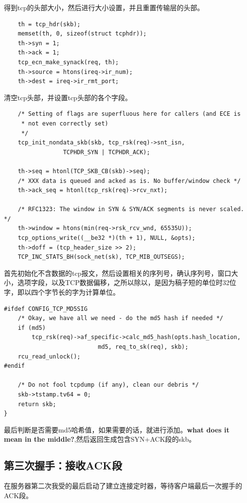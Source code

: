 				得到tcp的头部大小，然后进行大小设置，并且重置传输层的头部。

\begin{verbatim}
	th = tcp_hdr(skb);
	memset(th, 0, sizeof(struct tcphdr));
	th->syn = 1;
	th->ack = 1;
	tcp_ecn_make_synack(req, th);
	th->source = htons(ireq->ir_num);
	th->dest = ireq->ir_rmt_port;
\end{verbatim}

				清空tcp头部，并设置tcp头部的各个字段。

\begin{verbatim}
	/* Setting of flags are superfluous here for callers (and ECE is
	 * not even correctly set)
	 */
	tcp_init_nondata_skb(skb, tcp_rsk(req)->snt_isn,
			     TCPHDR_SYN | TCPHDR_ACK);

	th->seq = htonl(TCP_SKB_CB(skb)->seq);
	/* XXX data is queued and acked as is. No buffer/window check */
	th->ack_seq = htonl(tcp_rsk(req)->rcv_nxt);

	/* RFC1323: The window in SYN & SYN/ACK segments is never scaled. */
	th->window = htons(min(req->rsk_rcv_wnd, 65535U));
	tcp_options_write((__be32 *)(th + 1), NULL, &opts);
	th->doff = (tcp_header_size >> 2);
	TCP_INC_STATS_BH(sock_net(sk), TCP_MIB_OUTSEGS);
\end{verbatim}

				首先初始化不含数据的tcp报文，然后设置相关的序列号，确认序列号，窗口大小，选项字段，以及TCP数据偏移，之所以除以，是因为稿子短的单位时32位字，即以四个字节长的字为计算单位。
				
\begin{verbatim}
#ifdef CONFIG_TCP_MD5SIG
	/* Okay, we have all we need - do the md5 hash if needed */
	if (md5)
		tcp_rsk(req)->af_specific->calc_md5_hash(opts.hash_location,
					       md5, req_to_sk(req), skb);
	rcu_read_unlock();
#endif

	/* Do not fool tcpdump (if any), clean our debris */
	skb->tstamp.tv64 = 0;
	return skb;
}
\end{verbatim}

				最后判断是否需要md5哈希值，如果需要的话，就进行添加。\textbf{what does it mean in the middle?},然后返回生成包含SYN+ACK段的skb。		

		\subsection{第三次握手：接收ACK段}

				在服务器第二次我受的最后启动了建立连接定时器，等待客户端最后一次握手的ACK段。			
